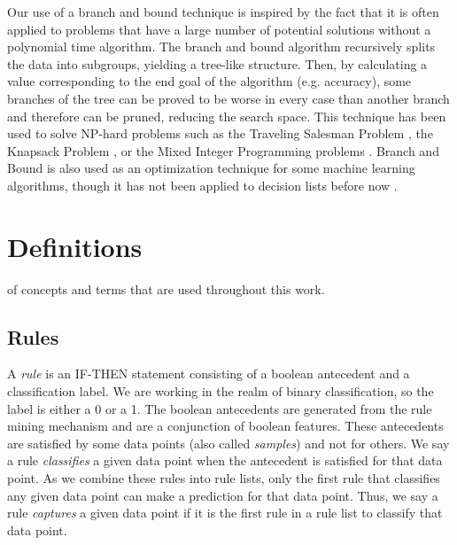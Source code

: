 \documentclass[]{report}
\theoremstyle{definition}
\begin{document}
Our use of a branch and bound technique is inspired by the fact that it is often applied to problems that have a large number of potential solutions without a polynomial time algorithm.
The branch and bound algorithm recursively splits the data into subgroups, yielding a tree-like structure.
Then, by calculating a value corresponding to the end goal of the algorithm (e.g. accuracy), some branches of the tree can be proved to be worse in every case than another branch and therefore can be pruned, reducing the search space.
This technique has been used to solve NP-hard problems such as the Traveling Salesman Problem \cite{LittleMuSwKa63}, the Knapsack Problem \cite{Kolesar67}, or the Mixed Integer Programming problems \cite{Clausen99}.
Branch and Bound is also used as an optimization technique for some machine learning algorithms, though it has not been applied to decision lists before now \cite{ChapelleSiKe06}.

\chapter{Definitions}\label{ch:definitions}
 of concepts and terms that are used throughout this work.

\section{Rules}
A \textit{rule} is an IF-THEN statement consisting of a boolean antecedent and a classification label.
We are working in the realm of binary classification, so the label is either a 0 or a 1.
The boolean antecedents are generated from the rule mining mechanism and are a conjunction of boolean features.
These antecedents are satisfied by some data points (also called \textit{samples}) and not for others.
We say a rule \textit{classifies} a given data point when the antecedent is satisfied for that data point.
As we combine these rules into rule lists, only the first rule that classifies any given data point can make a prediction for that data point.
Thus, we say a rule \textit{captures} a given data point if it is the first rule in a rule list to classify that data point.
\end{document}
